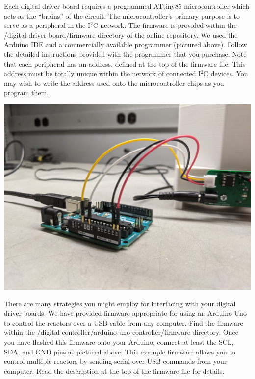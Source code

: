 \documentclass[11pt]{article}
\begin{document}
Each digital driver board requires a programmed ATtiny85 microcontroller which acts as the ``brains'' of the circuit.
The microcontroller's primary purpose is to serve as a peripheral in the I$^2$C network.
The firmware is provided within the /digital-driver-board/firmware directory of the online repository.
We used the Arduino IDE and a commercially available programmer (pictured above).
Follow the detailed instructions provided with the programmer that you purchase.
Note that each peripheral has an address, defined at the top of the firmware file.
This address must be totally unique within the network of connected I$^2$C devices.
You may wish to write the address used onto the microcontroller chips as you program them.

\begin{center}
  \includegraphics[width=\textwidth/2]{"./arduino-interface.jpg"}
\end{center}

There are many strategies you might employ for interfacing with your digital driver boards.
We have provided firmware appropriate for using an Arduino Uno to control the reactors over a USB cable from any computer.
Find the firmware within the /digital-controller/arduino-uno-controller/firmware directory.
Once you have flashed this firmware onto your Arduino, connect at least the SCL, SDA, and GND pins as pictured above.
This example firmware allows you to control multiple reactors by sending serial-over-USB commands from your computer.
Read the description at the top of the firmware file for details.


\end{document}
